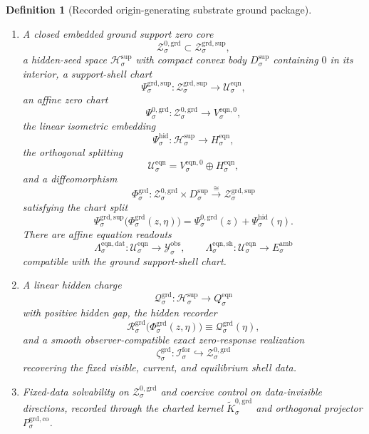 \documentclass[11pt]{article}
\newcommand{\ForSpace}[1]{\mathcal I_{#1}^{\mathrm{for}}}
\newcommand{\DataSpace}[1]{\mathcal Y_{#1}^{\mathrm{obs}}}
\newcommand{\AmbientTarget}[1]{E_{#1}^{\mathrm{amb}}}
\newcommand{\GroundShellSet}[1]{\mathcal Z_{#1}^{\mathrm{grd}}}
\newcommand{\GroundSupport}[1]{\Theta_{#1}^{\mathrm{grd,sup}}}
\newcommand{\GroundSupportShell}[1]{\mathcal Z_{#1}^{\mathrm{grd,sup}}}
\newcommand{\GroundZeroCore}[1]{\mathcal Z_{#1}^{0,\mathrm{grd}}}
\newcommand{\GroundEqChart}[1]{\Psi_{#1}^{\mathrm{grd,sup}}}
\newcommand{\GroundZeroChart}[1]{\Psi_{#1}^{0,\mathrm{grd}}}
\newcommand{\GroundSplit}[1]{\Phi_{#1}^{\mathrm{grd}}}
\newcommand{\GroundCharge}[1]{\mathcal Q_{#1}^{\mathrm{grd}}}
\newcommand{\GroundResidual}[1]{\mathcal R_{#1}^{\mathrm{grd}}}
\newcommand{\GroundEmbed}[1]{\zeta_{#1}^{\mathrm{grd}}}
\newcommand{\GroundKernelCh}[1]{\widetilde K_{#1}^{0,\mathrm{grd}}}
\newcommand{\GroundStateComp}[1]{P_{#1}^{\mathrm{grd,co}}}
\newcommand{\ResTarget}[1]{S_{#1}^{\mathrm{sup,res}}}
\newcommand{\SeedHidden}[1]{\mathcal H_{#1}^{\mathrm{sup}}}
\newcommand{\SeedHiddenBody}[1]{D_{#1}^{\mathrm{sup}}}
\newcommand{\EqnSpace}[1]{\mathcal U_{#1}^{\mathrm{eqn}}}
\newcommand{\EqnTarget}[1]{Q_{#1}^{\mathrm{eqn}}}
\newcommand{\EqnData}[1]{\Lambda_{#1}^{\mathrm{eqn,dat}}}
\newcommand{\EqnShell}[1]{\Lambda_{#1}^{\mathrm{eqn,sh}}}
\newcommand{\EqnHidden}[1]{H_{#1}^{\mathrm{eqn}}}
\newcommand{\EqnZero}[1]{V_{#1}^{\mathrm{eqn},0}}
\newcommand{\HiddenChart}[1]{\Psi_{#1}^{\mathrm{hid}}}
\newtheorem{definition}{Definition}
\begin{document}
\begin{definition}[Recorded origin-generating substrate ground package]
\begin{enumerate}
    \[
    \GroundSupport{\sigma}:\GroundShellSet{\sigma}\to\ResTarget{\sigma},
    \]
    the exact ground support shell
    \[
    \GroundSupportShell{\sigma}
    \equiv
    \bigl(\GroundSupport{\sigma}\bigr)^{-1}(0)\cap\GroundShellSet{\sigma},
    \]
    and the corresponding support-shell transport to the same reservoir space.
    \item A closed embedded ground support zero core
    \[
    \GroundZeroCore{\sigma}\subset\GroundSupportShell{\sigma},
    \]
    a hidden-seed space \(\SeedHidden{\sigma}\) with compact convex body \(\SeedHiddenBody{\sigma}\) containing \(0\) in its interior, a support-shell chart
    \[
    \GroundEqChart{\sigma}:\GroundSupportShell{\sigma}\to\EqnSpace{\sigma},
    \]
    an affine zero chart
    \[
    \GroundZeroChart{\sigma}:\GroundZeroCore{\sigma}\to\EqnZero{\sigma},
    \]
    the linear isometric embedding
    \[
    \HiddenChart{\sigma}:\SeedHidden{\sigma}\to\EqnHidden{\sigma},
    \]
    the orthogonal splitting
    \[
    \EqnSpace{\sigma}
    =
    \EqnZero{\sigma}\oplus\EqnHidden{\sigma},
    \]
    and a diffeomorphism
    \[
    \GroundSplit{\sigma}:
    \GroundZeroCore{\sigma}\times\SeedHiddenBody{\sigma}
    \xrightarrow{\cong}
    \GroundSupportShell{\sigma}
    \]
    satisfying the chart split
    \[
    \GroundEqChart{\sigma}\bigl(\GroundSplit{\sigma}(z,\eta)\bigr)
    =
    \GroundZeroChart{\sigma}(z)+\HiddenChart{\sigma}(\eta).
    \]
    There are affine equation readouts
    \[
    \EqnData{\sigma}:\EqnSpace{\sigma}\to\DataSpace{\sigma},
    \qquad
    \EqnShell{\sigma}:\EqnSpace{\sigma}\to\AmbientTarget{\sigma}
    \]
    compatible with the ground support-shell chart.
    \item A linear hidden charge
    \[
    \GroundCharge{\sigma}:\SeedHidden{\sigma}\to\EqnTarget{\sigma}
    \]
    with positive hidden gap, the hidden recorder
    \[
    \GroundResidual{\sigma}\bigl(\GroundSplit{\sigma}(z,\eta)\bigr)
    \equiv
    \GroundCharge{\sigma}(\eta),
    \]
    and a smooth observer-compatible exact zero-response realization
    \[
    \GroundEmbed{\sigma}:\ForSpace{\sigma}\hookrightarrow\GroundZeroCore{\sigma}
    \]
    recovering the fixed visible, current, and equilibrium shell data.
    \item Fixed-data solvability on \(\GroundZeroCore{\sigma}\) and coercive control on data-invisible directions, recorded through the charted kernel \(\GroundKernelCh{\sigma}\) and orthogonal projector \(\GroundStateComp{\sigma}\).
\end{enumerate}
\end{definition}
\end{document}
